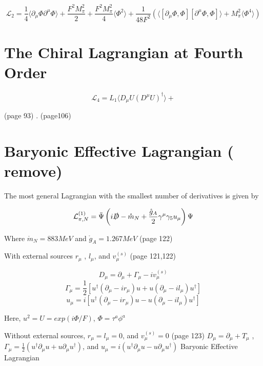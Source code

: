 \documentclass{article}
\begin{document}
$$\mathcal L_{2}=\frac{1}{4} \Big \langle \partial_{\mu} \Phi \partial^{\mu} \Phi \Big \rangle 
+ \frac{F^{2}M_{\pi}^2}{2} 
+ \frac{F^{2}M_{\pi}^2}{4} \langle  \Phi^{2}  \rangle 
+\frac{1}{48F^{2}} \left( \Big \langle \left[ \partial_{\mu}\Phi, \Phi \right] \left[ \partial^{\mu}\Phi, \Phi \right] \Big \rangle 
+M_{\pi}^2  \langle \Phi^{4}  \rangle \right)$$


\newpage
\section{The Chiral Lagrangian at Fourth Order}


$$\mathcal L_{4}=L_{1} \Big \langle D_{\mu} U (D^{\mu} U)^{\dag} \Big \rangle 
+$$



\cite{scherer2003introduction} (page 93)
\cite{pich1995chiral}. (page106)










\newpage
\section{Baryonic Effective Lagrangian ( remove)   }


The most general Lagrangian with the smallest number of derivatives is given by

$$ \mathcal{L}_{\pi,N}^{(1)} = \bar{\Psi} \left( i\slashed{D} -\mathring{m}_{N}  + \frac{\mathring{g}_{A}}{2} \gamma^{\mu} \gamma_{5} u_{\mu} \right) \Psi$$ 

Where $\mathring{m}_{N}= 883 MeV$ and $\mathring{g}_{A}= 1.267 MeV$ \cite{scherer2003introduction} (page 122)

\vspace{5mm}
With external sources $ r_{\mu}$ , $ l_{\mu}$, and $v_{\mu}^{(s)} $ \cite{scherer2003introduction} (page 121,122)

$$ D_{\mu} = \partial_{\mu} + \Gamma_{\mu} -iv_{\mu}^{(s)}$$
$$ \Gamma_{\mu} = \frac{1}{2} \left[  u^{\dag} (\partial_{\mu}-ir_{\mu}) u + u (\partial_{\mu}-il_{\mu} ) u^{\dag} \right] $$
$$ u_{\mu} = i \left[  u^{\dag} (\partial_{\mu}-ir_{\mu}) u - u (\partial_{\mu}-il_{\mu} ) u^{\dag} \right]   $$

Here, $u^{2}= U = exp(i \Phi/F) $, $ \Phi = \tau^{a} \phi^{a} $

\vspace{5mm}

Without external sources, $ r_{\mu} = l_{\mu} =0 $, and $v_{\mu}^{(s)}=0 $ \cite{scherer2003introduction} (page 123)
$ D_{\mu} = \partial_{\mu} + T_{\mu}$ ,  
$\Gamma_{\mu} = \frac{1}{2} \left(  u^{\dag} \partial_{\mu} u + u \partial_{\mu} u^{\dag} \right)   $, and
$ u_{\mu} = i \left(  u^{\dag} \partial_{\mu} u - u \partial_{\mu} u^{\dag} \right)   $
Baryonic Effective Lagrangian
\end{document}
